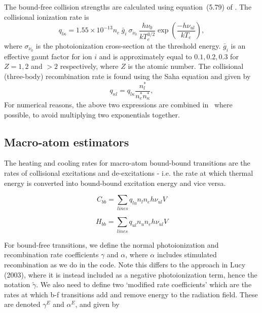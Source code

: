 The bound-free collision strengths are calculated using equation~(5.79) of
\cite{mihalas}. The collisional ionization rate is
\begin{equation}
q_{l\kappa} = 1.55 \times 10^{-13} n_e~\bar{g}_{i}~\sigma_{\nu_0}~
\frac{h \nu_0}{k T_e^{3/2}}
\exp \left( \frac{- h \nu_{ul}}{k T_e} \right),
\label{eq:vanregemorterw}
\end{equation}
where $\sigma_{\nu_0}$ is the photoionization cross-section at the threshold energy.
$\bar{g}_{i}$ is an effective gaunt factor for ion $i$ and is approximately
equal to $0.1,0.2,0.3$ for $Z=1,2$ and $>2$ respectively,
where $Z$ is the atomic number. 
The collisional (three-body) recombination rate is found using the Saha equation
and given by
\begin{equation}
q_{\kappa l} = q_{l\kappa} \frac{n_l^*}{n_e^* n_\kappa^*},
\label{eq:vanregemorterw}
\end{equation}
For numerical reasons, the above two expressions are combined in \py\ where 
possible, to avoid multiplying two exponentials together.





\subsection{Macro-atom estimators}


The heating and cooling rates for macro-atom bound-bound transitions are the rates of
collisional excitations and de-excitations
- i.e. the rate at which thermal energy is converted into
bound-bound excitation energy and vice versa.

\begin{equation}
C_{bb} = \sum_{lines} q_{lu} n_l n_e h \nu_{ul} V
\end{equation}

\begin{equation}
H_{bb} = \sum_{lines} q_{ul} n_u n_e h \nu_{ul} V
\end{equation}

\noindent
For bound-free transitions, we define the normal photoionization and recombination
rate coefficients $\gamma$ and $\alpha$, where $\alpha$ includes
stimulated recombination as we do in the code. Note
this differs to the approach in Lucy (2003), where it is instead included as a 
negative photoionization term, hence the notation $\widetilde{\gamma}$.
We also need to define two `modified rate coefficients' which 
are the rates at which b-f transitions add and remove energy to the radiation field.
These are denoted $\gamma^E$ and $\alpha^E$, and given by

